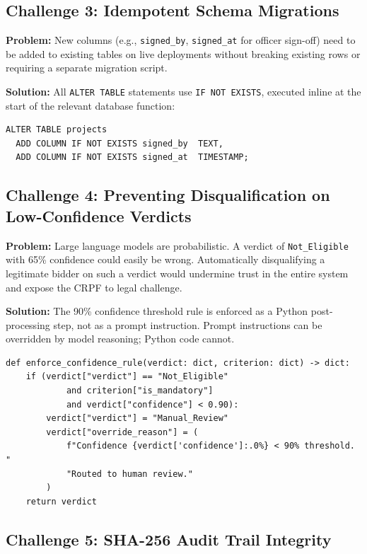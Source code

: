 \documentclass[12pt,a4paper]{article}
\begin{document}
\subsection{Challenge 3: Idempotent Schema Migrations}

\textbf{Problem:} New columns (e.g., \texttt{signed\_by}, \texttt{signed\_at} for
officer sign-off) need to be added to existing tables on live deployments without
breaking existing rows or requiring a separate migration script.

\textbf{Solution:} All \texttt{ALTER TABLE} statements use \texttt{IF NOT EXISTS},
executed inline at the start of the relevant database function:

\begin{lstlisting}[style=sqlstyle, caption={Idempotent column addition}]
ALTER TABLE projects
  ADD COLUMN IF NOT EXISTS signed_by  TEXT,
  ADD COLUMN IF NOT EXISTS signed_at  TIMESTAMP;
\end{lstlisting}

\subsection{Challenge 4: Preventing Disqualification on Low-Confidence Verdicts}

\textbf{Problem:} Large language models are probabilistic. A verdict of
\texttt{Not\_Eligible} with 65\% confidence could easily be wrong. Automatically
disqualifying a legitimate bidder on such a verdict would undermine trust in the
entire system and expose the CRPF to legal challenge.

\textbf{Solution:} The 90\% confidence threshold rule is enforced as a Python
post-processing step, not as a prompt instruction. Prompt instructions can be
overridden by model reasoning; Python code cannot.

\begin{lstlisting}[style=pythonstyle, caption={Confidence threshold enforcement}]
def enforce_confidence_rule(verdict: dict, criterion: dict) -> dict:
    if (verdict["verdict"] == "Not_Eligible"
            and criterion["is_mandatory"]
            and verdict["confidence"] < 0.90):
        verdict["verdict"] = "Manual_Review"
        verdict["override_reason"] = (
            f"Confidence {verdict['confidence']:.0%} < 90% threshold. "
            "Routed to human review."
        )
    return verdict
\end{lstlisting}

\subsection{Challenge 5: SHA-256 Audit Trail Integrity}
\end{document}

